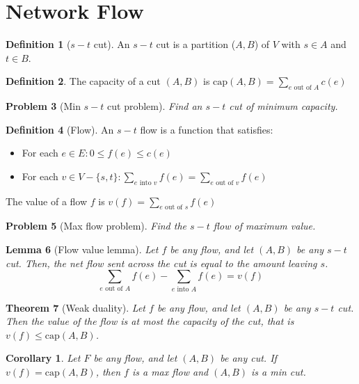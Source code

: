 \documentclass[10pt, oneside, reqno]{amsart}
\theoremstyle{plain}%
\newtheorem{thm}{Theorem}[section]
\newtheorem{prob}[thm]{Problem}
\newtheorem{lem}[thm]{Lemma}
\newtheorem*{cor}{Corollary}
\theoremstyle{definition}
\newtheorem{defn}[thm]{Definition}
\theoremstyle{remark}
\begin{document}


\section{Network Flow} %
\begin{defn}[$s-t$ cut]
	An $s-t$ cut is a partition ($A,B$) of $V$ with $s \in A$ and $t \in B$.
\end{defn}

\begin{defn}
The capacity of a cut $(A,B)$ is $\text{cap}(A,B) = \displaystyle\sum_{\text{$e$ out of $A$}}c(e)$
\end{defn}

\begin{prob}[Min $s-t$ cut problem]
Find an $s-t$ cut of minimum capacity.
\end{prob}

\begin{defn}[Flow]
	An $s-t$ flow is a function that satisfies:
	\begin{itemize}
		\item For each $e \in E: 0 \leq f(e) \leq c(e)$
		\item For each $v \in V - \{s,t\}:  \displaystyle \sum_{\text{$e$ into $v$}}f(e)  = \displaystyle \sum_{\text{$e$ out of  $v$}}f(e)$
	\end{itemize}
	
	The value of a flow $f$ is $v(f) = \displaystyle \sum_{\text{$e$ out of $s$}}f(e)$
\end{defn}

\begin{prob}[Max flow problem]
	Find the $s-t$ flow of maximum value.
\end{prob}

\newcommand{\sumsub}[1]{\displaystyle\sum_{\text{#1}}}
\begin{lem}[Flow value lemma]
	Let $f$ be any flow, and let $(A,B)$ be any $s-t$ cut.  Then, the net flow sent across the cut is equal to the amount leaving $s$.\[
		\sumsub{$e$ out of $A$} f(e) - \sumsub{$e$ into $A$}f(e) = v(f)
	\]
\end{lem}


\begin{thm}[Weak duality]
	Let $f$ be any flow, and let $(A,B)$ be any $s-t$ cut.  Then the value of the flow is at most the capacity of the cut, that is $v(f) \leq \text{cap}(A,B)$. 
\end{thm}

\begin{cor}
	Let $F$ be any flow, and let $(A,B)$ be any cut.  If $v(f) = \text{cap}(A,B)$, then $f$ is a max flow and $(A,B)$ is a min cut.
\end{cor}
\end{document}
